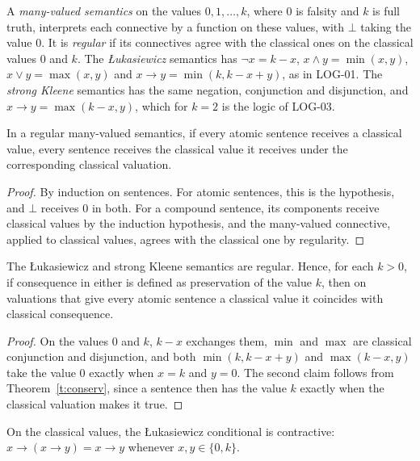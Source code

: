 \documentclass{situationist-preprint}
\begin{document}
\begin{definition}\label{d:mv}
A \emph{many-valued semantics} on the values $0, 1, \ldots, k$, where $0$ is falsity and $k$ is full truth, interprets each connective by a function on these values, with $\bot$ taking the value $0$. It is \emph{regular} if its connectives agree with the classical ones on the classical values $0$ and $k$. The \emph{Łukasiewicz} semantics has $\neg x = k - x$, $x \wedge y = \min(x,y)$, $x \vee y = \max(x,y)$ and $x \to y = \min(k, k - x + y)$, as in LOG-01. The \emph{strong Kleene} semantics has the same negation, conjunction and disjunction, and $x \to y = \max(k - x, y)$, which for $k = 2$ is the logic of LOG-03.
\end{definition}

\begin{theorem}\label{t:conserv}
In a regular many-valued semantics, if every atomic sentence receives a classical value, every sentence receives the classical value it receives under the corresponding classical valuation.
\end{theorem}

\begin{proof}
By induction on sentences. For atomic sentences, this is the hypothesis, and $\bot$ receives $0$ in both. For a compound sentence, its components receive classical values by the induction hypothesis, and the many-valued connective, applied to classical values, agrees with the classical one by regularity.
\end{proof}

\begin{corollary}\label{c:conserv}
The Łukasiewicz and strong Kleene semantics are regular. Hence, for each $k > 0$, if consequence in either is defined as preservation of the value $k$, then on valuations that give every atomic sentence a classical value it coincides with classical consequence.
\end{corollary}

\begin{proof}
On the values $0$ and $k$, $k - x$ exchanges them, $\min$ and $\max$ are classical conjunction and disjunction, and both $\min(k, k - x + y)$ and $\max(k - x, y)$ take the value $0$ exactly when $x = k$ and $y = 0$. The second claim follows from Theorem~\ref{t:conserv}, since a sentence then has the value $k$ exactly when the classical valuation makes it true.
\end{proof}

\begin{proposition}\label{p:contr}
On the classical values, the Łukasiewicz conditional is contractive: $x \to (x \to y) = x \to y$ whenever $x, y \in \{0, k\}$.
\end{proposition}
\end{document}
